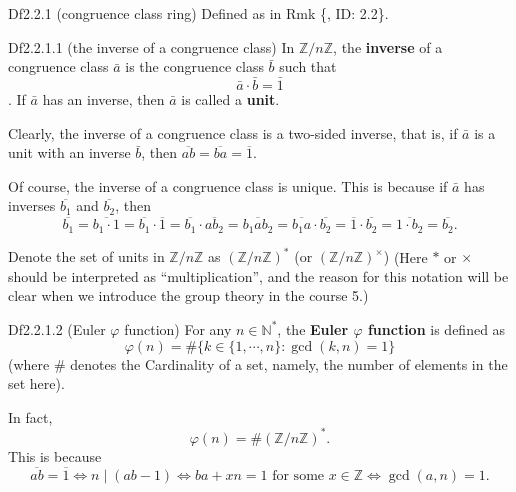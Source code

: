 \documentclass{article}
\begin{document}
\begin{Df}{Df2.2.1 (congruence class ring)}
    Defined as in Rmk \{, ID: 2.2\}.
\end{Df}

\begin{Df}{Df2.2.1.1 (the inverse of a congruence class)}
    In $\mathbb{Z}/n\mathbb{Z}$, the \textbf{inverse} of a congruence class $\bar{a}$ is the congruence class $\bar{b}$ such that
    $$ \bar{a}\cdot \bar{b} = \bar{1} $$.
    If $\bar{a}$ has an inverse, then $\bar{a}$ is called a \textbf{unit}.
\end{Df}

\begin{Rmk}{}
    \begin{compactenum}
        \item \textcolor{Th}{Clearly, the inverse of a congruence class is a two-sided inverse, that is, if $\bar{a}$ is a unit with an inverse $\bar{b}$, then $\overline{ab} = \overline{ba} = \overline{1}$.} 
        \item \textcolor{Th}{Of course, the inverse of a congruence class is unique.} This is because if $\bar{a}$ has inverses $\overline{b_1}$ and $\overline{b_2}$, then
        $$ \overline{b_1} = \overline{b_1\cdot 1} = \overline{b_1}\cdot \overline{1} = \overline{b_1}\cdot \overline{ab_2} = \overline{b_1ab_2} = \overline{b_1a}\cdot \overline{b_2} = \overline{1}\cdot \overline{b_2} = \overline{1\cdot b_2} = \overline{b_2}. $$
        \item \textcolor{Df}{Denote the set of units in $\mathbb{Z}/n\mathbb{Z}$ as $(\mathbb{Z}/n\mathbb{Z})^\ast$ (or $(\mathbb{Z}/n\mathbb{Z})^\times$)} (Here $\ast$ or $\times$ should be interpreted as ``multiplication'', and the reason for this notation will be clear when we introduce the group theory in the course 5.)
    \end{compactenum}
\end{Rmk}

\begin{Df}{Df2.2.1.2 (Euler $\varphi$ function)}
    For any $n\in\mathbb{N}^\ast$, the \textbf{Euler $\varphi$ function} is defined as
    $$ \varphi(n) = \# \{k\in\{1, \cdots, n\}: \gcd(k, n) = 1\} $$
    (where $\#$ denotes the Cardinality of a set, namely, the number of elements in the set here).
\end{Df}

\begin{Rmk}{}
    \textcolor{Th}{In fact,
    $$ \varphi(n) = \# (\mathbb{Z}/n\mathbb{Z})^\ast. $$}
    This is because 
    $$ \overline{ab} = \overline{1} \Leftrightarrow n\mid (ab-1) \Leftrightarrow ba + xn = 1 \text{ for some } x\in\mathbb{Z} \Leftrightarrow \gcd(a, n) = 1. $$
\end{Rmk}
\end{document}
